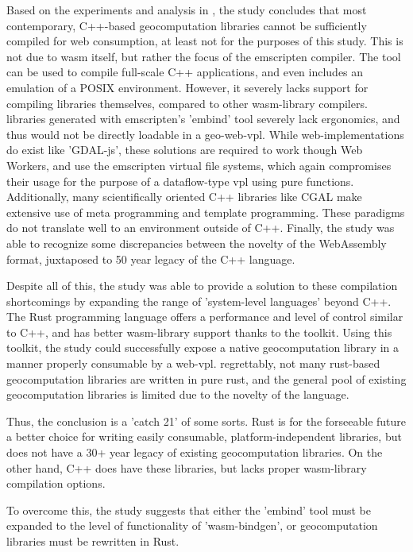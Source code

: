 Based on the experiments and analysis in , the study concludes that most contemporary, C++-based geocomputation libraries cannot be sufficiently compiled for web consumption, at least not for the purposes of this study.    
This is not due to wasm itself, but rather the focus of the emscripten compiler.
The tool can be used to compile full-scale C++ applications, and even includes an emulation of a POSIX environment.
However, it severely lacks support for compiling libraries themselves, compared to other wasm-library compilers.
libraries generated with emscripten's 'embind' tool severely lack ergonomics, and thus would not be directly loadable in a geo-web-vpl.
While web-implementations do exist like 'GDAL-js', these solutions are required to work though Web Workers, and use the emscripten virtual file systems, which again compromises their usage for the purpose of a dataflow-type vpl using pure functions.
Additionally, many scientifically oriented C++ libraries like CGAL make extensive use of meta programming and template programming. 
These paradigms do not translate well to an environment outside of C++. 
Finally, the study was able to recognize some discrepancies between the novelty of the WebAssembly format, juxtaposed to 50 year legacy of the C++ language.

Despite all of this, the study was able to provide a solution to these compilation shortcomings by expanding the range of 'system-level languages' beyond C++. 
The Rust programming language offers a performance and level of control similar to C++, and has better wasm-library support thanks to the  toolkit. 
Using this toolkit, the study could successfully expose a native geocomputation library in a manner properly consumable by a web-vpl.
regrettably, not many rust-based geocomputation libraries are written in pure rust, and the general pool of existing geocomputation libraries is limited due to the novelty of the language. 

Thus, the conclusion is a 'catch 21' of some sorts.
Rust is for the forseeable future a better choice for writing easily consumable, platform-independent libraries, but does not have a 30+ year legacy of existing geocomputation libraries. 
On the other hand, C++ does have these libraries, but lacks proper wasm-library compilation options.

To overcome this, the study suggests that either the 'embind' tool must be expanded to the level of functionality of  'wasm-bindgen', or geocomputation libraries must be rewritten in Rust. 

